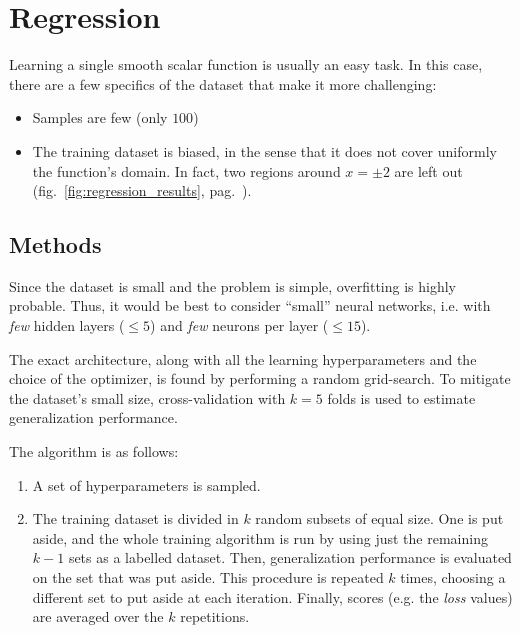 \documentclass[11pt,a4paper]{scrartcl}
\newcommand{\q}[1]{``#1''}
\begin{document}

\section{Regression \label{sec:regression}}
Learning a single smooth scalar function is usually an easy task. In this case, there are a few specifics of the dataset that make it more challenging:
\begin{itemize}
    \item Samples are few (only $100$)
    \item The training dataset is biased, in the sense that it does not cover uniformly the function's domain. In fact, two regions around $x = \pm 2$ are left out (fig.~\ref{fig:regression_results}, pag.~\pageref{fig:regression_results}).
\end{itemize}

\subsection{Methods}
Since the dataset is small and the problem is simple, overfitting is highly probable. Thus, it would be best to consider \q{small} neural networks, i.e. with \textit{few} hidden layers ($\leq 5$) and \textit{few} neurons per layer ($\leq 15$).

\medskip

The exact architecture, along with all the learning hyperparameters and the choice of the optimizer, is found by performing a random grid-search. To mitigate the dataset's small size, cross-validation with $k=5$ folds is used to estimate generalization performance. 

\medskip

The algorithm is as follows:
\begin{enumerate}
    \item A set of hyperparameters is sampled.
    \item The training dataset is divided in $k$ random subsets of equal size. One is put aside, and the whole training algorithm is run by using just the remaining $k-1$ sets as a labelled dataset. Then, generalization performance is evaluated on the set that was put aside. This procedure is repeated $k$ times, choosing a different set to put aside at each iteration. Finally, scores (e.g. the \textit{loss} values) are averaged over the $k$ repetitions.
\end{enumerate}
\end{document}
